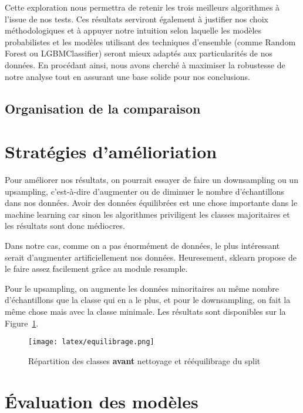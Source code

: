 \documentclass[11pt]{article}
\begin{document}
Cette exploration nous permettra de retenir les trois meilleurs algorithmes à l'issue de nos tests. Ces résultats serviront également à justifier nos choix méthodologiques et à appuyer notre intuition selon laquelle les modèles probabilistes et les modèles utilisant des techniques d'ensemble (comme Random Forest ou LGBMClassifier) seront mieux adaptés aux particularités de nos données. En procédant ainsi, nous avons cherché à maximiser la robustesse de notre analyse tout en assurant une base solide pour nos conclusions.

\subsection{Organisation de la comparaison}

\section{Stratégies d'amélioriation}
Pour améliorer nos résultats, on pourrait essayer de faire un downsampling ou un upsampling, c'est-à-dire d'augmenter ou de diminuer le nombre d'échantillons dans nos données. Avoir des données équilibrées est une chose importante dans le machine learning car sinon les algorithmes priviligent les classes majoritaires et les résultats sont donc médiocres.

Dans notre cas, comme on a pas énormément de données, le plus intéressant serait d'augmenter artificiellement nos données. Heuresement, sklearn propose de le faire assez facilement grâce au module resample.

Pour le upsampling, on augmente les données minoritaires au même nombre d'échantillons que la classe qui en a le plus, et pour le downsampling, on fait la même chose mais avec la classe minimale. Les résultats sont disponibles sur la Figure~\ref{fig:equilibrage}.

\begin{figure}[H]
  \texttt{[image: latex/equilibrage.png]}
  \caption{Répartition des classes \textbf{avant} nettoyage et rééquilibrage du split}
  \label{fig:equilibrage} %
\end{figure}

\section{Évaluation des modèles}
\end{document}
